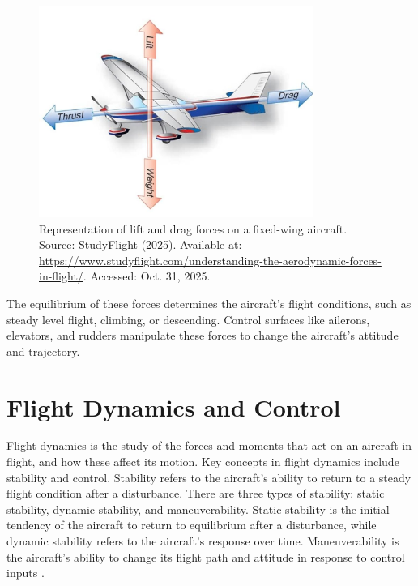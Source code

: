 \begin{figure}[H]
    \centering
    \includegraphics[width=0.8\textwidth]{figures/forces.jpg}
    \caption{Representation of lift and drag forces on a fixed-wing aircraft. \\ Source: StudyFlight (2025). Available at: \url{https://www.studyflight.com/understanding-the-aerodynamic-forces-in-flight/}. Accessed: Oct. 31, 2025.}
\end{figure}


The equilibrium of these forces determines the aircraft's flight conditions, such as steady level flight, climbing, or descending. Control surfaces like ailerons, elevators, and rudders manipulate these forces to change the aircraft's attitude and trajectory.

\section{Flight Dynamics and Control}


Flight dynamics is the study of the forces and moments that act on an aircraft in flight, and how these affect its motion. Key concepts in flight dynamics include stability and control. Stability refers to the aircraft's ability to return to a steady flight condition after a disturbance. There are three types of stability: static stability, dynamic stability, and maneuverability. Static stability is the initial tendency of the aircraft to return to equilibrium after a disturbance, while dynamic stability refers to the aircraft's response over time. Maneuverability is the aircraft's ability to change its flight path and attitude in response to control inputs \cite{ETKIN1996}.

